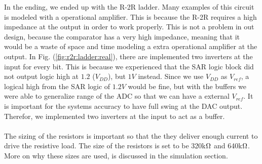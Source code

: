 \documentclass[english, 12pt, a4paper]{ifimaster}
\begin{document}
\newline
In the ending, we ended up with the R-2R ladder. Many examples of this circuit is modeled with a operational amplifier. This is because the R-2R requires a high impedance at the output in order to
work properly. This is not a problem in out design, because the comparator has a very high impedance, meaning that it would be a waste of space and time modeling a extra operational amplifier at
the output. In Fig. (\ref{fig:r2r:ladder:real}), there are implemented two inverters at the input for every bit. This is because we experienced that the SAR logic block did not output logic high at
\(1.2\) (\(V_{DD}\)), but \(1 V\) instead. Since we use \(V_{DD}\) as \(V_{ref}\), a logical high from the SAR logic of \(1.2 V\) would be fine, but with the buffers we were able to generalize range of the ADC so that we can have a external \(V_{ref}\).
It is important for the systems accuracy to have full swing at the DAC output. Therefor, we implemented two inverters at the input to act as a buffer.\\ 
\\
The sizing of the resistors is important so that the they deliver enough current to drive the resistive load.
The size of the resistors is set to be 320k\(\ohm\) and 640k\(\ohm\). More on why these sizes are used, is discussed in the simulation section. 
\end{document}
